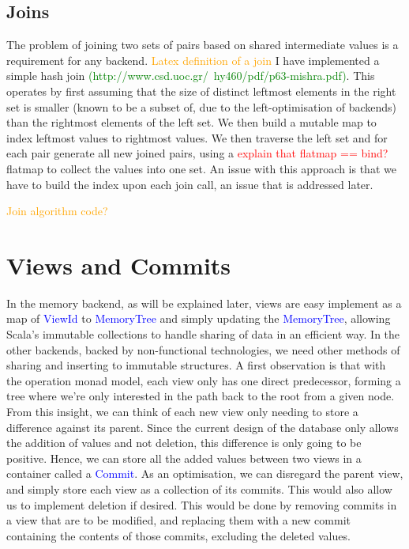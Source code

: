 \documentclass[12pt,a4paper,twoside,openright]{report}
\newcommand\todo[1]{\textcolor{red}{#1}}
\newcommand\codeName[1]{\textcolor{blue}{#1}}
\newcommand\toReference[1]{\textcolor{green}{#1}}
\newcommand\diagramNeeded[1]{\textcolor{orange}{#1}}
\begin{document}
{{	\subsection{Joins}
	The problem of joining two sets of pairs based on shared intermediate values is a requirement for any backend. \diagramNeeded{Latex definition of a join}  I have implemented a simple hash join \toReference{(http://www.csd.uoc.gr/~hy460/pdf/p63-mishra.pdf)}. This operates by first assuming that the size of distinct leftmost elements in the right set is smaller (known to be a subset of, due to the left-optimisation of backends) than the rightmost elements of the left set. We then build a mutable map to index leftmost values to rightmost values. We then traverse the left set and for each pair generate all new joined pairs, using a \todo{explain that flatmap == bind?} flatmap to collect the values into one set. An issue with this approach is that we have to build the index upon each join call, an issue that is addressed later.
	
	\diagramNeeded{Join algorithm code?}
	
\section{Views and Commits}
In the memory backend, as will be explained later, views are easy implement as a map of \codeName{ViewId} to \codeName{MemoryTree} and simply updating the \codeName{MemoryTree}, allowing Scala's immutable collections to handle sharing of data in an efficient way. In the other backends, backed by non-functional technologies, we need other methods of sharing and inserting to immutable structures. A first observation is that with the operation monad model, each view only has one direct predecessor, forming a tree where we're only interested in the path back to the root from a given node. From this insight, we can think of each new view only needing to store a difference against its parent. Since the current design of the database only allows the addition of values and not deletion, this difference is only going to be positive. Hence, we can store all the added values between two views in a container called a \codeName{Commit}. As an optimisation, we can disregard the parent view, and simply store each view as a collection of its commits. This would also allow us to implement deletion if desired. This would be done by removing commits in a view that are to be modified, and replacing them with a new commit containing the contents of those commits, excluding the deleted values.

}}
\end{document}
